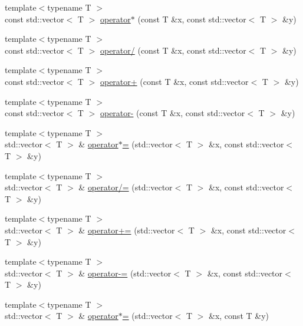 \begin{DoxyCompactItemize}
{\footnotesize template$<$typename T $>$ }\\const std\+::vector$<$ T $>$ \hyperlink{centroidalifold_2contrafold_2_utilities_8ipp_afa57077fa69a822dfe1938396c307b81}{operator$\ast$} (const T \&x, const std\+::vector$<$ T $>$ \&y)
\item 
{\footnotesize template$<$typename T $>$ }\\const std\+::vector$<$ T $>$ \hyperlink{centroidalifold_2contrafold_2_utilities_8ipp_a223c655adedf1f1fe2acb0bf852a49a6}{operator/} (const T \&x, const std\+::vector$<$ T $>$ \&y)
\item 
{\footnotesize template$<$typename T $>$ }\\const std\+::vector$<$ T $>$ \hyperlink{centroidalifold_2contrafold_2_utilities_8ipp_a9980cc43673f8c9f685c500a1ea6e89c}{operator+} (const T \&x, const std\+::vector$<$ T $>$ \&y)
\item 
{\footnotesize template$<$typename T $>$ }\\const std\+::vector$<$ T $>$ \hyperlink{centroidalifold_2contrafold_2_utilities_8ipp_a088dbb8065fc5c3752f74d372370640b}{operator-\/} (const T \&x, const std\+::vector$<$ T $>$ \&y)
\item 
{\footnotesize template$<$typename T $>$ }\\std\+::vector$<$ T $>$ \& \hyperlink{centroidalifold_2contrafold_2_utilities_8ipp_aed2c5cbeefc6e8d3166c406f581a8654}{operator$\ast$=} (std\+::vector$<$ T $>$ \&x, const std\+::vector$<$ T $>$ \&y)
\item 
{\footnotesize template$<$typename T $>$ }\\std\+::vector$<$ T $>$ \& \hyperlink{centroidalifold_2contrafold_2_utilities_8ipp_aa2459c271ecf612a026ad273d183fb21}{operator/=} (std\+::vector$<$ T $>$ \&x, const std\+::vector$<$ T $>$ \&y)
\item 
{\footnotesize template$<$typename T $>$ }\\std\+::vector$<$ T $>$ \& \hyperlink{centroidalifold_2contrafold_2_utilities_8ipp_a8a1d708250dbef941e052cfbab978587}{operator+=} (std\+::vector$<$ T $>$ \&x, const std\+::vector$<$ T $>$ \&y)
\item 
{\footnotesize template$<$typename T $>$ }\\std\+::vector$<$ T $>$ \& \hyperlink{centroidalifold_2contrafold_2_utilities_8ipp_a83468849cdd5d53237c8e59d477d66d9}{operator-\/=} (std\+::vector$<$ T $>$ \&x, const std\+::vector$<$ T $>$ \&y)
\item 
{\footnotesize template$<$typename T $>$ }\\std\+::vector$<$ T $>$ \& \hyperlink{centroidalifold_2contrafold_2_utilities_8ipp_a8a39142b83e4405e96095bb4ea56f5e4}{operator$\ast$=} (std\+::vector$<$ T $>$ \&x, const T \&y)

\end{DoxyCompactItemize}
